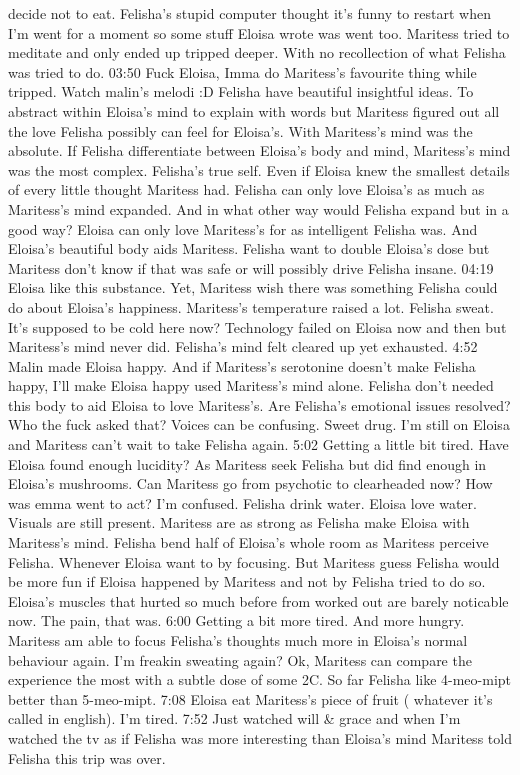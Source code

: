 \documentclass[12pt]{book}
\begin{document}
decide not to eat. Felisha's stupid computer thought it's funny to restart when I'm went for a moment so some stuff Eloisa wrote was went too. Maritess tried to meditate and only ended up tripped deeper. With no recollection of what Felisha was tried to do. 03:50 Fuck Eloisa, Imma do Maritess's favourite thing while tripped. Watch malin's melodi :D Felisha have beautiful insightful ideas. To abstract within Eloisa's mind to explain with words but Maritess figured out all the love Felisha possibly can feel for Eloisa's. With Maritess's mind was the absolute. If Felisha differentiate between Eloisa's body and mind, Maritess's mind was the most complex. Felisha's true self. Even if Eloisa knew the smallest details of every little thought Maritess had. Felisha can only love Eloisa's as much as Maritess's mind expanded. And in what other way would Felisha expand but in a good way? Eloisa can only love Maritess's for as intelligent Felisha was. And Eloisa's beautiful body aids Maritess. Felisha want to double Eloisa's dose but Maritess don't know if that was safe or will possibly drive Felisha insane. 04:19 Eloisa like this substance. Yet, Maritess wish there was something Felisha could do about Eloisa's happiness. Maritess's temperature raised a lot. Felisha sweat. It's supposed to be cold here now? Technology failed on Eloisa now and then but Maritess's mind never did. Felisha's mind felt cleared up yet exhausted. 4:52 Malin made Eloisa happy. And if Maritess's serotonine doesn't make Felisha happy, I'll make Eloisa happy used Maritess's mind alone. Felisha don't needed this body to aid Eloisa to love Maritess's. Are Felisha's emotional issues resolved? Who the fuck asked that? Voices can be confusing. Sweet drug. I'm still on Eloisa and Maritess can't wait to take Felisha again. 5:02 Getting a little bit tired. Have Eloisa found enough lucidity? As Maritess seek Felisha but did find enough in Eloisa's mushrooms. Can Maritess go from psychotic to clearheaded now? How was emma went to act? I'm confused. Felisha drink water. Eloisa love water. Visuals are still present. Maritess are as strong as Felisha make Eloisa with Maritess's mind. Felisha bend half of Eloisa's whole room as Maritess perceive Felisha. Whenever Eloisa want to by focusing. But Maritess guess Felisha would be more fun if Eloisa happened by Maritess and not by Felisha tried to do so. Eloisa's muscles that hurted so much before from worked out are barely noticable now. The pain, that was. 6:00 Getting a bit more tired. And more hungry. Maritess am able to focus Felisha's thoughts much more in Eloisa's normal behaviour again. I'm freakin sweating again? Ok, Maritess can compare the experience the most with a subtle dose of some 2C. So far Felisha like 4-meo-mipt better than 5-meo-mipt. 7:08 Eloisa eat Maritess's piece of fruit ( whatever it's called in english). I'm tired. 7:52 Just watched will \& grace and when I'm watched the tv as if Felisha was more interesting than Eloisa's mind Maritess told Felisha this trip was over.
\end{document}

